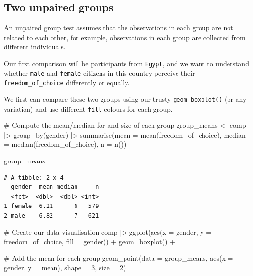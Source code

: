\documentclass[
  letterpaper,
]{krantz}
\makeatletter
\newenvironment{Shaded}{\begin{snugshade}}{\end{snugshade}}
\newcommand{\AttributeTok}[1]{\textcolor[rgb]{0.40,0.45,0.13}{#1}}
\newcommand{\CommentTok}[1]{\textcolor[rgb]{0.37,0.37,0.37}{#1}}
\newcommand{\DecValTok}[1]{\textcolor[rgb]{0.68,0.00,0.00}{#1}}
\newcommand{\FunctionTok}[1]{\textcolor[rgb]{0.28,0.35,0.67}{#1}}
\newcommand{\NormalTok}[1]{\textcolor[rgb]{0.00,0.23,0.31}{#1}}
\newcommand{\OtherTok}[1]{\textcolor[rgb]{0.00,0.23,0.31}{#1}}
\newcommand{\SpecialCharTok}[1]{\textcolor[rgb]{0.37,0.37,0.37}{#1}}
\newenvironment{kframe}{%
\medskip{}
\setlength{\fboxsep}{.8em}
 \def\at@end@of@kframe{}%
 \ifinner\ifhmode%
  \def\at@end@of@kframe{\end{minipage}}%
  \begin{minipage}{\columnwidth}%
 \fi\fi%
 \def\FrameCommand##1{\hskip\@totalleftmargin \hskip-\fboxsep
 \colorbox{shadecolor}{##1}\hskip-\fboxsep
     \hskip-\linewidth \hskip-\@totalleftmargin \hskip\columnwidth}%
 \MakeFramed {\advance\hsize-\width
   \@totalleftmargin\z@ \linewidth\hsize
   \@setminipage}}%
 {\par\unskip\endMakeFramed%
 \at@end@of@kframe}
\renewenvironment{Shaded}{\begin{kframe}}{\end{kframe}}
\makeatother
\begin{document}
\subsection{Two unpaired groups}\label{sec-two-unpaired-groups}

An unpaired group test assumes that the observations in each group are
not related to each other, for example, observations in each group are
collected from different individuals.

Our first comparison will be participants from \texttt{Egypt}, and we
want to understand whether \texttt{male} and \texttt{female} citizens in
this country perceive their \texttt{freedom\_of\_choice} differently or
equally.

We first can compare these two groups using our trusty
\texttt{geom\_boxplot()} (or any variation) and use different
\texttt{fill} colours for each group.

\begin{Shaded}
\begin{Highlighting}[]
\CommentTok{\# Compute the mean/median for and size of each group}
\NormalTok{group\_means }\OtherTok{\textless{}{-}}
\NormalTok{  comp }\SpecialCharTok{|\textgreater{}}
  \FunctionTok{group\_by}\NormalTok{(gender) }\SpecialCharTok{|\textgreater{}}
  \FunctionTok{summarise}\NormalTok{(}\AttributeTok{mean =} \FunctionTok{mean}\NormalTok{(freedom\_of\_choice),}
            \AttributeTok{median =} \FunctionTok{median}\NormalTok{(freedom\_of\_choice),}
            \AttributeTok{n =} \FunctionTok{n}\NormalTok{())}

\NormalTok{group\_means}
\end{Highlighting}
\end{Shaded}

\begin{verbatim}
# A tibble: 2 x 4
  gender  mean median     n
  <fct>  <dbl>  <dbl> <int>
1 female  6.21      6   579
2 male    6.82      7   621
\end{verbatim}

\begin{Shaded}
\begin{Highlighting}[]
\CommentTok{\# Create our data visualisation}
\NormalTok{comp }\SpecialCharTok{|\textgreater{}}
  \FunctionTok{ggplot}\NormalTok{(}\FunctionTok{aes}\NormalTok{(}\AttributeTok{x =}\NormalTok{ gender, }\AttributeTok{y =}\NormalTok{ freedom\_of\_choice, }\AttributeTok{fill =}\NormalTok{ gender)) }\SpecialCharTok{+}
  \FunctionTok{geom\_boxplot}\NormalTok{() }\SpecialCharTok{+}

  \CommentTok{\# Add the mean for each group}
  \FunctionTok{geom\_point}\NormalTok{(}\AttributeTok{data =}\NormalTok{ group\_means,}
             \FunctionTok{aes}\NormalTok{(}\AttributeTok{x =}\NormalTok{ gender, }\AttributeTok{y =}\NormalTok{ mean),}
             \AttributeTok{shape =} \DecValTok{3}\NormalTok{,}
             \AttributeTok{size =} \DecValTok{2}\NormalTok{)}
\end{Highlighting}
\end{Shaded}
\end{document}

